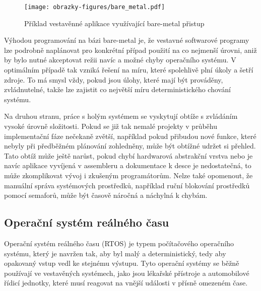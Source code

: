 \begin{figure}[h]
    \centering
    \texttt{[image: obrazky-figures/bare\_metal.pdf]}
    
    \caption{Příklad vestavěnné aplikace využívající bare-metal přistup}
    \label{fig:bare-metal}
\end{figure}


Výhodou programování na bázi bare-metal je, že vestavné softwarové programy lze podrobně naplánovat pro konkrétní případ použití na co nejmenší úrovni, aniž by bylo nutné akceptovat režii navíc a možné chyby operačního systému. V optimálním případě tak vzniká řešení na míru, které spolehlivě plní úkoly a šetří zdroje. To má smysl vždy, pokud jsou úlohy, které mají být prováděny, zvládnutelné, takže lze zajistit co největší míru deterministického chování systému. \cite{sysgo_baremetal_vs_rtos}

Na druhou stranu, práce s holým systémem se vyskytují obtíže s zvládáním vysoké úrovně složitosti. Pokud se již tak nemalé projekty v průběhu implementační fáze nečekaně zvětší, například pokud přibudou nové funkce, které nebyly při předběžném plánování zohledněny, může být obtížné udržet si přehled. Tato obtíž může ještě narůst, pokud chybí hardwarová abstrakční vrstva nebo je navíc aplikace vyvíjená v assembleru a dokumentace k desce je nedostatečná, to může zkomplikovat vývoj i zkušeným programátorům. Nelze také opomenout, že manuální správa systémových prostředků, například ruční blokování prostředků pomocí semaforů, může být časově náročná a náchylná k chybám. \cite{sysgo_baremetal_vs_rtos}

\subsection{Operační systém reálného času}
Operační systém reálného času (RTOS) je typem počítačového operačního systému, který je navržen tak, aby byl malý a deterministický, tedy aby opakovaný vstup vedl ke stejnému výstupu. Tyto operační systémy se běžně používají ve vestavěných systémech, jako jsou lékařské přístroje a automobilové řídicí jednotky, které musí reagovat na vnější události v přísně omezeném čase. \cite{freertos_what_is_rtos}

